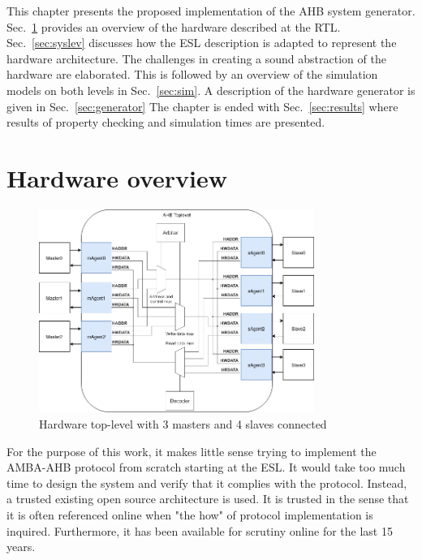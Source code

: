 \label{ch:impl}
This chapter presents the proposed implementation of the AHB system generator. Sec.~\ref{sec:hardover} provides an overview of the hardware described at the RTL. Sec.~\ref{sec:syslev} discusses how the ESL description is adapted to represent the hardware architecture. The challenges in creating a sound abstraction
of the hardware are elaborated. This is followed by an overview of the simulation models on both levels in Sec.~\ref{sec:sim}. A description of the hardware generator is given in Sec.~\ref{sec:generator} The chapter is ended with Sec.~\ref{sec:results} where results of property checking and simulation times are presented.

\newpage
\section{Hardware overview}
\label{sec:hardover}
\begin{figure}[hbt]
    \begin{center}
        \includegraphics[width=0.8\textwidth]{figs/hw/Hw_toplevel.png}
    \end{center}
    \caption{Hardware top-level with 3 masters and 4 slaves connected}
    \label{fig:hw_toplev}
\end{figure}

For the purpose of this work, it makes little sense trying to implement the AMBA-AHB protocol from scratch starting at the ESL. It would take too much time to design the system and verify that it complies with the protocol. Instead, a trusted existing open source architecture is used. It is trusted in the sense that
it is often referenced online when "the how" of protocol implementation is inquired. Furthermore, it has been available for scrutiny online for the last 15 years.  


